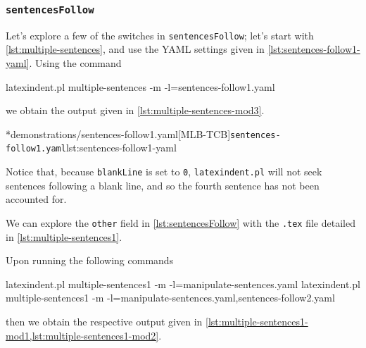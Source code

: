 \subsubsection{\texttt{sentencesFollow}}
	Let's explore a few of the switches in \texttt{sentencesFollow}; let's start with \vref{lst:multiple-sentences}, and use the YAML settings given in \cref{lst:sentences-follow1-yaml}.
	Using the command \begin{commandshell}
latexindent.pl multiple-sentences -m -l=sentences-follow1.yaml
\end{commandshell} we obtain the output given in \cref{lst:multiple-sentences-mod3}.

	\begin{minipage}{.5\linewidth}
	\end{minipage}
	\hfill
	\begin{minipage}{.5\linewidth}
		\cmhlistingsfromfile*[style=yaml-LST]*{demonstrations/sentences-follow1.yaml}[MLB-TCB]{\texttt{sentences-follow1.yaml}}{lst:sentences-follow1-yaml}
	\end{minipage}

	Notice that, because \texttt{blankLine} is set to \texttt{0}, \texttt{latexindent.pl} will not seek sentences following a blank line, and so the fourth sentence has not been accounted for.

	We can explore the \texttt{other} field in \cref{lst:sentencesFollow} with the \texttt{.tex} file detailed in \cref{lst:multiple-sentences1}.


	Upon running the following commands \begin{widepage} \begin{commandshell}
latexindent.pl multiple-sentences1 -m -l=manipulate-sentences.yaml
latexindent.pl multiple-sentences1 -m -l=manipulate-sentences.yaml,sentences-follow2.yaml
	\end{commandshell} \end{widepage} then we obtain the respective output given in \cref{lst:multiple-sentences1-mod1,lst:multiple-sentences1-mod2}.

